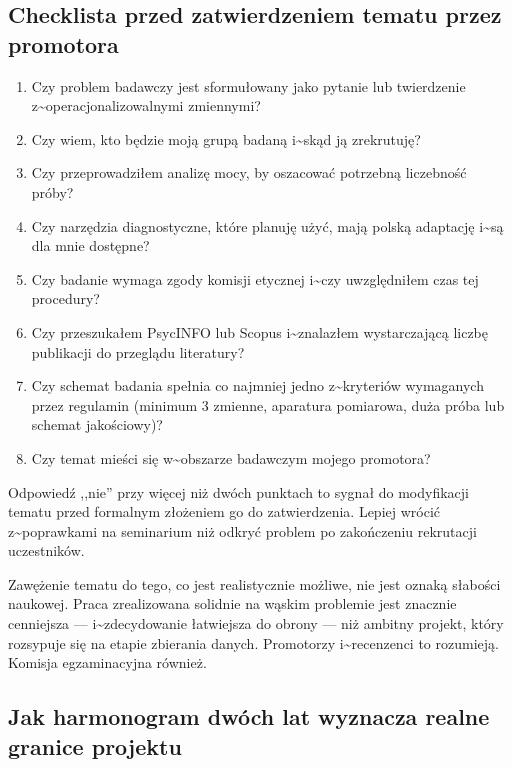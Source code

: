 \documentclass[12pt,a4paper,twoside,openany]{book}
\begin{document}
\subsection{Checklista przed zatwierdzeniem tematu przez promotora}


\begin{enumerate}
  \item Czy problem badawczy jest sformułowany jako pytanie lub twierdzenie z\textasciitilde{}operacjonalizowalnymi zmiennymi?
  \item Czy wiem, kto będzie moją grupą badaną i\textasciitilde{}skąd ją zrekrutuję?
  \item Czy przeprowadziłem analizę mocy, by oszacować potrzebną liczebność próby?
  \item Czy narzędzia diagnostyczne, które planuję użyć, mają polską adaptację i\textasciitilde{}są dla mnie dostępne?
  \item Czy badanie wymaga zgody komisji etycznej i\textasciitilde{}czy uwzględniłem czas tej procedury?
  \item Czy przeszukałem PsycINFO lub Scopus i\textasciitilde{}znalazłem wystarczającą liczbę publikacji do przeglądu literatury?
  \item Czy schemat badania spełnia co najmniej jedno z\textasciitilde{}kryteriów wymaganych przez regulamin (minimum 3 zmienne, aparatura pomiarowa, duża próba lub schemat jakościowy)?
  \item Czy temat mieści się w\textasciitilde{}obszarze badawczym mojego promotora?
\end{enumerate}


Odpowiedź ,,nie'' przy więcej niż dwóch punktach to sygnał do modyfikacji tematu przed formalnym złożeniem go do zatwierdzenia. Lepiej wrócić z\textasciitilde{}poprawkami na seminarium niż odkryć problem po zakończeniu rekrutacji uczestników.


\begin{keyinsight} Zawężenie tematu do tego, co jest realistycznie możliwe, nie jest oznaką słabości naukowej. Praca zrealizowana solidnie na wąskim problemie jest znacznie cenniejsza --- i\textasciitilde{}zdecydowanie łatwiejsza do obrony --- niż ambitny projekt, który rozsypuje się na etapie zbierania danych. Promotorzy i\textasciitilde{}recenzenci to rozumieją. Komisja egzaminacyjna również.
\end{keyinsight}


\subsection{Jak harmonogram dwóch lat wyznacza realne granice projektu}
\end{document}
